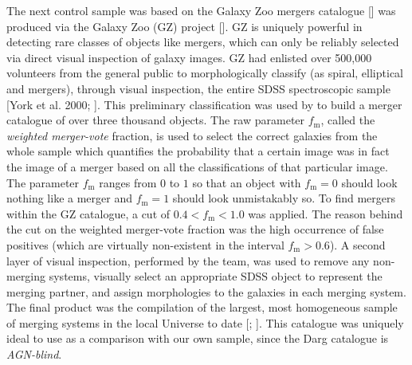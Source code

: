 The next control sample was based on the Galaxy Zoo mergers catalogue [\cite{2010MNRAS.401.1552D}] was produced via the Galaxy Zoo (GZ) project [\cite{2008MNRAS.389.1179L}]. GZ is uniquely powerful in detecting rare classes of objects like mergers, which can only be reliably selected via direct visual inspection of galaxy images. GZ had enlisted over 500,000 volunteers from the general public to morphologically classify (as spiral, elliptical and mergers), through visual inspection, the entire SDSS spectroscopic sample [York et al. 2000; \cite{2008ApJS..175..297A}]. This preliminary classification was used by \cite{2010MNRAS.401.1043D} to build a merger catalogue of over three thousand objects. The raw parameter $f_{\text{m}}$, called the \textit{weighted merger-vote} fraction, is used to select the correct galaxies from the whole sample which quantifies the probability that a certain image was in fact the image of a merger based on all the classifications of that particular image. The parameter $f_{\text{m}}$ ranges from $0$ to $1$ so that an object with $f_{\text{m}}=0$ should look nothing like a merger and $f_{\text{m}}=1$ should look unmistakably so. To find mergers within the GZ catalogue, a cut of ${0.4}<{f_{\text{m}}}<{1.0}$ was applied. The reason behind the cut on the weighted merger-vote fraction was the high occurrence of false positives (which are virtually non-existent in the interval $f_{\text{m}}>{0.6}$). A second layer of visual inspection, performed by the team, was used to remove any non-merging systems, visually select an appropriate SDSS object to represent the merging partner, and assign morphologies to the galaxies in each merging system. The final product was the compilation of the largest, most homogeneous sample of merging systems in the local Universe to date [\cite{2010MNRAS.401.1552D}; \cite{2010MNRAS.401.1043D}]. This catalogue was uniquely ideal to use as a comparison with our own sample, since the Darg catalogue is \textit{AGN-blind}.

  
  
  